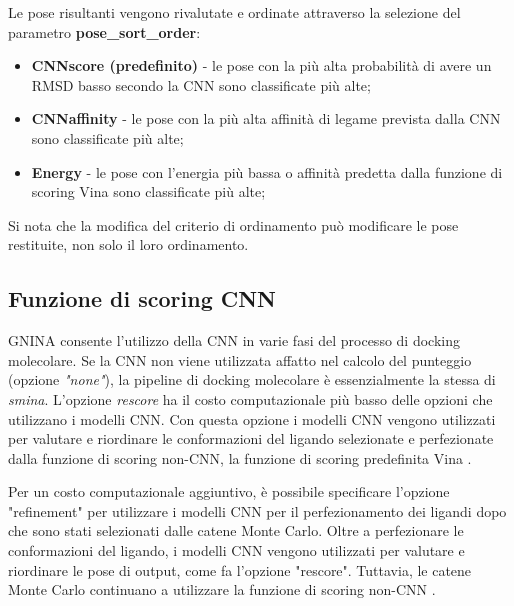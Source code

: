 Le pose risultanti vengono rivalutate e ordinate attraverso la selezione del parametro \textbf{pose\_sort\_order}:
\begin{itemize}
    \item \textbf{CNNscore (predefinito)} - le pose con la più alta probabilità di avere un RMSD basso secondo la CNN sono classificate più alte;
    \item \textbf{CNNaffinity} - le pose con la più alta affinità di legame prevista dalla CNN sono classificate più alte;
    \item \textbf{Energy} - le pose con l'energia più bassa o affinità predetta dalla funzione di scoring Vina sono classificate più alte;
\end{itemize}

Si nota che la modifica del criterio di ordinamento può modificare le pose restituite, non solo il loro ordinamento.

\subsection{Funzione di scoring CNN} \label{cnn_scoring_method}
GNINA consente l'utilizzo della CNN in varie fasi del processo di docking molecolare. 
Se la CNN non viene utilizzata affatto nel calcolo del punteggio (opzione \textit{"none"}), la pipeline di docking molecolare è essenzialmente la stessa di \textit{smina}. 
L'opzione \textit{rescore} ha il costo computazionale più basso delle opzioni che utilizzano i modelli CNN.
Con questa opzione i modelli CNN vengono utilizzati per valutare e riordinare le conformazioni del ligando selezionate e perfezionate dalla funzione di scoring non-CNN, la funzione di scoring predefinita Vina \cite{mcnutt_gnina_2021}. 

Per un costo computazionale aggiuntivo, è possibile specificare l'opzione "refinement" per utilizzare i modelli CNN per il perfezionamento dei ligandi dopo che sono stati selezionati dalle catene Monte Carlo. 
Oltre a perfezionare le conformazioni del ligando, i modelli CNN vengono utilizzati per valutare e riordinare le pose di output, come fa l'opzione "rescore". Tuttavia, le catene Monte Carlo continuano a utilizzare la funzione di scoring non-CNN \cite{mcnutt_gnina_2021}. 

